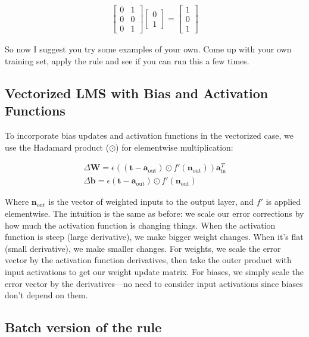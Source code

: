 \begin{align*}
\begin{bmatrix} 0 & 1 \\ 0 & 0 \\  0  & 1  \end{bmatrix}
\begin{bmatrix} 0 \\ 1 \end{bmatrix}
= \begin{bmatrix} 1 \\ 0 \\ 1  \end{bmatrix}
\end{align*}

So now I suggest you try some examples of your own. Come up with your own training set, apply the rule and see if you can run this a few times. 

\subsection{Vectorized LMS with Bias and Activation Functions}

To incorporate bias updates and activation functions in the vectorized case, we use the Hadamard product ($\odot$) for elementwise multiplication:

\begin{eqnarray*}
\Delta \mathbf{W}  =  \epsilon ((\mathbf{t} - \mathbf{a}_{\text{out}}) \odot f'( \mathbf{n}_{\text{out}})) \mathbf{a}_{\text{in}}^T \\
\Delta \mathbf{b}  =  \epsilon (\mathbf{t} - \mathbf{a}_{\text{out}}) \odot f'( \mathbf{n}_{\text{out}})
\end{eqnarray*}

Where $\mathbf{n}_{\text{out}}$ is the vector of weighted inputs to the output layer, and $f'$ is applied elementwise. The intuition is the same as before: we scale our error corrections by how much the activation function is changing things. When the activation function is steep (large derivative), we make bigger weight changes. When it's flat (small derivative), we make smaller changes. For weights, we scale the error vector by the activation function derivatives, then take the outer product with input activations to get our weight update matrix. For biases, we simply scale the error vector by the derivatives—no need to consider input activations since biases don't depend on them.

\subsection{Batch version of the rule}

